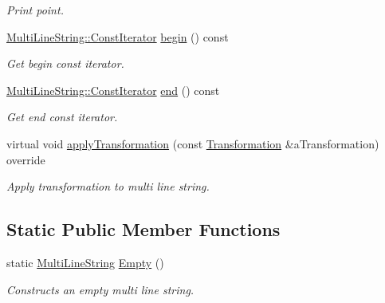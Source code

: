 \begin{DoxyCompactItemize}
\begin{DoxyCompactList}\small\item\em Print point. \end{DoxyCompactList}\item 
\hyperlink{classlibrary_1_1math_1_1geom_1_1d2_1_1objects_1_1_multi_line_string_ae9d86dd3f4a78f03347ada9781158b85}{Multi\+Line\+String\+::\+Const\+Iterator} \hyperlink{classlibrary_1_1math_1_1geom_1_1d2_1_1objects_1_1_multi_line_string_a4fe1cbb1f12f2ea9f84189db37e6d0c6}{begin} () const
\begin{DoxyCompactList}\small\item\em Get begin const iterator. \end{DoxyCompactList}\item 
\hyperlink{classlibrary_1_1math_1_1geom_1_1d2_1_1objects_1_1_multi_line_string_ae9d86dd3f4a78f03347ada9781158b85}{Multi\+Line\+String\+::\+Const\+Iterator} \hyperlink{classlibrary_1_1math_1_1geom_1_1d2_1_1objects_1_1_multi_line_string_a38c15891b74932039b859b8978eb7b90}{end} () const
\begin{DoxyCompactList}\small\item\em Get end const iterator. \end{DoxyCompactList}\item 
virtual void \hyperlink{classlibrary_1_1math_1_1geom_1_1d2_1_1objects_1_1_multi_line_string_a6180a8b94ff175d6313a74ad4e680bc7}{apply\+Transformation} (const \hyperlink{classlibrary_1_1math_1_1geom_1_1d2_1_1_transformation}{Transformation} \&a\+Transformation) override
\begin{DoxyCompactList}\small\item\em Apply transformation to multi line string. \end{DoxyCompactList}\end{DoxyCompactItemize}
\subsection*{Static Public Member Functions}
\begin{DoxyCompactItemize}
\item 
static \hyperlink{classlibrary_1_1math_1_1geom_1_1d2_1_1objects_1_1_multi_line_string}{Multi\+Line\+String} \hyperlink{classlibrary_1_1math_1_1geom_1_1d2_1_1objects_1_1_multi_line_string_aaa30610df3584b30f80e33ff0f5cd8bb}{Empty} ()
\begin{DoxyCompactList}\small\item\em Constructs an empty multi line string. \end{DoxyCompactList}\end{DoxyCompactItemize}


